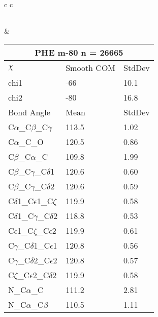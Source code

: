 \begin{longtable}{ c c }
\begin{tabular}{ l l l }
  \bottomrule
  \end{tabular}
  &
  \begin{tabular}{ l l l }
  \toprule
  \multicolumn{3}{c}{PHE \textbf{m-80} n = 26665} \\ \toprule
  $\chi$       & Smooth COM & StdDev \\ \midrule
  chi1 & -66 & 10.1 \\ 
  chi2 & -80 & 16.8 \\ \midrule
  Bond Angle   & Mean     & StdDev \\ \midrule
  C$\alpha$\_C$\beta$\_C$\gamma$ & 113.5 & 1.02\\
  C$\alpha$\_C\_O & 120.5 & 0.86\\
  C$\beta$\_C$\alpha$\_C & 109.8 & 1.99\\
  C$\beta$\_C$\gamma$\_C$\delta$1 & 120.6 & 0.60\\
  C$\beta$\_C$\gamma$\_C$\delta$2 & 120.6 & 0.59\\
  C$\delta$1\_C$\epsilon$1\_C$\zeta$ & 119.9 & 0.58\\
  C$\delta$1\_C$\gamma$\_C$\delta$2 & 118.8 & 0.53\\
  C$\epsilon$1\_C$\zeta$\_C$\epsilon$2 & 119.9 & 0.61\\
  C$\gamma$\_C$\delta$1\_C$\epsilon$1 & 120.8 & 0.56\\
  C$\gamma$\_C$\delta$2\_C$\epsilon$2 & 120.8 & 0.57\\
  C$\zeta$\_C$\epsilon$2\_C$\delta$2 & 119.9 & 0.58\\
  N\_C$\alpha$\_C & 111.2 & 2.81\\
  N\_C$\alpha$\_C$\beta$ & 110.5 & 1.11\\
  \bottomrule
  \end{tabular}
  \\
  
\end{longtable}

\newpage

